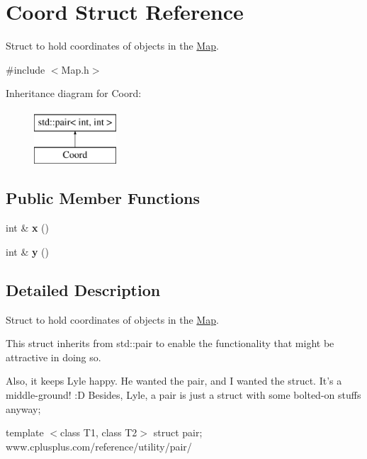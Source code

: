 \hypertarget{structCoord}{\section{Coord Struct Reference}
\label{structCoord}
}


Struct to hold coordinates of objects in the \hyperlink{classMap}{Map}.  




{\ttfamily \#include $<$Map.\-h$>$}

Inheritance diagram for Coord\-:\begin{figure}[H]
\begin{center}
\leavevmode
\includegraphics[height=2.000000cm]{structCoord}
\end{center}
\end{figure}
\subsection*{Public Member Functions}
\begin{DoxyCompactItemize}
\item 
\hypertarget{structCoord_a685dd99f1e32d5e79f1fe6a7bbbceb76}{int \& {\bfseries x} ()}\label{structCoord_a685dd99f1e32d5e79f1fe6a7bbbceb76}

\item 
\hypertarget{structCoord_ab924c640df45524f31d54ee5c4870cbc}{int \& {\bfseries y} ()}\label{structCoord_ab924c640df45524f31d54ee5c4870cbc}

\end{DoxyCompactItemize}


\subsection{Detailed Description}
Struct to hold coordinates of objects in the \hyperlink{classMap}{Map}. 

This struct inherits from std\-::pair to enable the functionality that might be attractive in doing so.

Also, it keeps Lyle happy. He wanted the pair, and I wanted the struct. It's a middle-\/ground! \-:D Besides, Lyle, a pair is just a struct with some bolted-\/on stuffs anyway;

template $<$class T1, class T2$>$ struct pair; www.\-cplusplus.\-com/reference/utility/pair/ 



